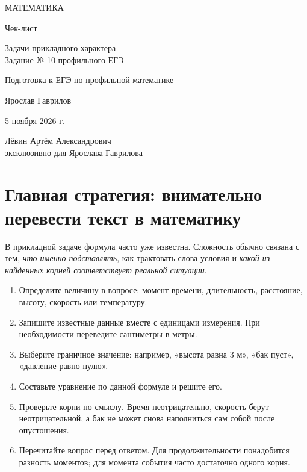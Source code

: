 \documentclass[a4paper,11pt]{article}
\newcommand{\keyword}[1]{\textcolor{darkaccent}{#1}}
\begin{document}
\thispagestyle{empty}
\begin{center}
\vspace*{17mm}
{\large\color{darkaccent}МАТЕМАТИКА\par}
\vspace{9mm}
{\LARGE\color{textgray}Чек-лист\par}
\vspace{9mm}
{\Large\color{accent}Задачи прикладного характера\\[3pt]Задание № 10 профильного ЕГЭ\par}
\vspace{13mm}
{\large Подготовка к ЕГЭ по профильной математике\par}
\vfill
{\large Ярослав Гаврилов\par}
\vspace{9mm}
{\large 5 ноября 2026 г.\par}
\vspace{9mm}
{\normalsize Лёвин Артём Александрович\\[3pt]
эксклюзивно для Ярослава Гаврилова\par}
\vspace{11mm}
\vspace{5mm}
\end{center}
\clearpage

\section{Главная стратегия: внимательно перевести текст в математику}
В прикладной задаче формула часто уже известна. Сложность обычно связана с тем, \emph{что именно подставлять}, как трактовать слова условия и \emph{какой из найденных корней соответствует реальной ситуации}.

\begin{enumerate}[label=\arabic*.]
\item \keyword{Определите величину в вопросе:} момент времени, длительность, расстояние, высоту, скорость или температуру.
\item \keyword{Запишите известные данные} вместе с единицами измерения. При необходимости переведите сантиметры в метры.
\item \keyword{Выберите граничное значение:} например, «высота равна 3 м», «бак пуст», «давление равно нулю».
\item \keyword{Составьте уравнение} по данной формуле и решите его.
\item \keyword{Проверьте корни по смыслу.} Время неотрицательно, скорость берут неотрицательной, а бак не может снова наполниться сам собой после опустошения.
\item \keyword{Перечитайте вопрос перед ответом.} Для продолжительности понадобится разность моментов; для момента события часто достаточно одного корня.
\end{enumerate}
\end{document}

